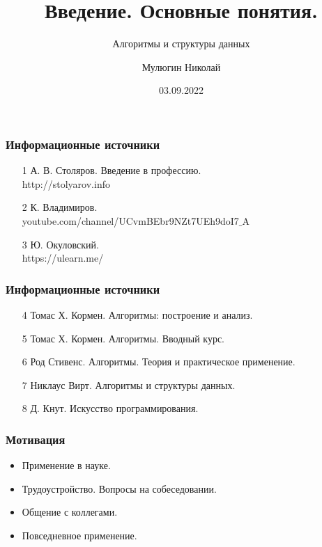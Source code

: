 \documentclass[russian, 12pt]{beamer}
\title{Введение. Основные понятия.}
\subtitle{Алгоритмы и структуры данных}
\author{
  Мулюгин Николай
  }
\date{03.09.2022}
\begin{document}
\begin{frame}
\titlepage
\end{frame}
\begin{frame}
\frametitle{Информационные источники}
  \begin{itemize}
    \item [1] А. В. Столяров. Введение в профессию.\\
      http://stolyarov.info\\[0.5cm]

    \item [2] К. Владимиров.\\
    youtube.com/channel/UCvmBEbr9NZt7UEh9doI7$\_$A\\[0.5cm]

    \item [3] Ю. Окуловский.\\ 
    https://ulearn.me/

  \end{itemize}
\end{frame}
\begin{frame}
\frametitle{Информационные источники}
  \begin{itemize}
    \item [4] Томас Х. Кормен. Алгоритмы: построение и анализ.\\[0.5cm]

    \item [5] Томас Х. Кормен. Алгоритмы. Вводный курс.\\[0.5cm]

    \item [6] Род Стивенс. Алгоритмы. Теория и практическое применение.\\[0.5cm]
    
    \item [7] Никлаус Вирт. Алгоритмы и структуры данных.\\[0.5cm]
    
    \item [8] Д. Кнут. Искусство программирования.

  \end{itemize}
\end{frame}
\begin{frame}
\frametitle{Мотивация}
  \begin{itemize}
    \item Применение в науке.\\[0.5cm]

    \item Трудоустройство. Вопросы на собеседовании.\\[0.5cm]

    \item Общение с коллегами.\\[0.5cm]
    
    \item Повседневное применение.\\[0.5cm]

  \end{itemize}
\end{frame}
\end{document}
